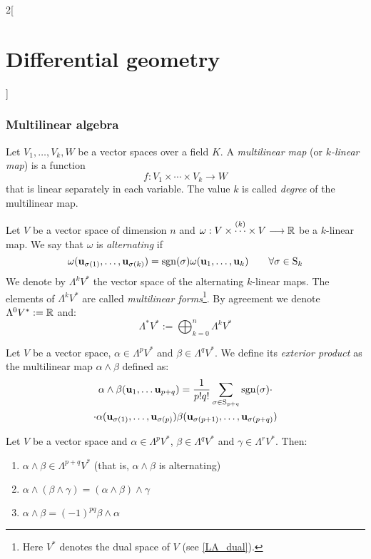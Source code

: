 \documentclass[../../../main_math.tex]{subfiles}
\begin{document}
\begin{multicols}{2}[\section{Differential geometry}]
  \subsubsection{Multilinear algebra}
  \begin{definition}
    Let $V_1,\ldots,V_k,W$ be a vector spaces over a field $K$. A \emph{multilinear map} (or \emph{$k$-linear map}) is a function $$f:V_1\times\cdots\times V_k\longrightarrow W$$ that is linear separately in each variable. The value $k$ is called \emph{degree} of the multilinear map.
  \end{definition}
  \begin{definition}
    Let $V$ be a vector space of dimension $n$ and $\omega:V\times\overset{(k)}{\cdots}\times V\longrightarrow \mathbb{R}$ be a $k$-linear map. We say that $\omega$ is \emph{alternating} if $$\omega(\boldsymbol{\mathrm{u}}_{\sigma(1)},\ldots,\boldsymbol{\mathrm{u}}_{\sigma(k)})=\operatorname{sgn}(\sigma)\omega(\boldsymbol{\mathrm{u}}_1,\ldots,\boldsymbol{\mathrm{u}}_k)\qquad\forall\sigma\in \text{S}_k$$
    We denote by $\Lambda^kV^*$ the vector space of the alternating $k$-linear maps. The elements of $\Lambda^kV^*$ are called \emph{multilinear forms}\footnote{Here $V^*$ denotes the dual space of $V$ (see \cref{LA_dual}).}. By agreement we denote $\Lambda^0V^*:=\mathbb{R}$ and: $$\Lambda^*V^*:=\bigoplus_{k=0}^{n}\Lambda^kV^*$$
  \end{definition}
  \begin{definition}
    Let $V$ be a vector space, $\alpha\in\Lambda^pV^*$ and $\beta\in\Lambda^qV^*$. We define its \emph{exterior product} as the multilinear map $\alpha\wedge\beta$ defined as:
    \begin{multline*}
      \alpha\wedge\beta(\boldsymbol{\mathrm{u}}_1,\ldots\boldsymbol{\mathrm{u}}_{p+q})=\frac{1}{p!q!}\sum_{\sigma\in \text{S}_{p+q}}\operatorname{sgn}(\sigma)\cdot\\\cdot\alpha(\boldsymbol{\mathrm{u}}_{\sigma(1)},\ldots,\boldsymbol{\mathrm{u}}_{\sigma(p)})\beta(\boldsymbol{\mathrm{u}}_{\sigma(p+1)},\ldots,\boldsymbol{\mathrm{u}}_{\sigma(p+q)})
    \end{multline*}
  \end{definition}
  \begin{proposition}
    Let $V$ be a vector space and $\alpha\in\Lambda^pV^*$, $\beta\in\Lambda^qV^*$ and $\gamma\in\Lambda^rV^*$. Then:
    \begin{enumerate}
      \item $\alpha\wedge\beta\in\Lambda^{p+q}V^*$ (that is, $\alpha\wedge\beta$ is alternating)
      \item $\alpha\wedge(\beta\wedge\gamma)=(\alpha\wedge\beta)\wedge\gamma$
      \item $\alpha\wedge\beta={(-1)}^{pq}\beta\wedge\alpha$

\end{enumerate}
\end{proposition}
\end{multicols}
\end{document}

